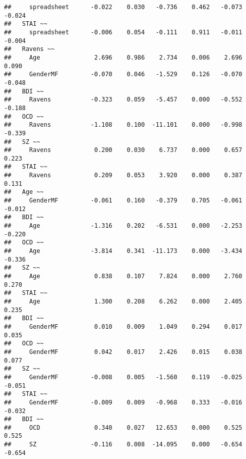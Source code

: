 \documentclass[]{article}
\begin{document}
\begin{verbatim}
##     spreadsheet      -0.022    0.030   -0.736    0.462   -0.073   -0.024
##   STAI ~~                                                               
##     spreadsheet      -0.006    0.054   -0.111    0.911   -0.011   -0.004
##   Ravens ~~                                                             
##     Age               2.696    0.986    2.734    0.006    2.696    0.090
##     GenderMF         -0.070    0.046   -1.529    0.126   -0.070   -0.048
##   BDI ~~                                                                
##     Ravens           -0.323    0.059   -5.457    0.000   -0.552   -0.188
##   OCD ~~                                                                
##     Ravens           -1.108    0.100  -11.101    0.000   -0.998   -0.339
##   SZ ~~                                                                 
##     Ravens            0.200    0.030    6.737    0.000    0.657    0.223
##   STAI ~~                                                               
##     Ravens            0.209    0.053    3.920    0.000    0.387    0.131
##   Age ~~                                                                
##     GenderMF         -0.061    0.160   -0.379    0.705   -0.061   -0.012
##   BDI ~~                                                                
##     Age              -1.316    0.202   -6.531    0.000   -2.253   -0.220
##   OCD ~~                                                                
##     Age              -3.814    0.341  -11.173    0.000   -3.434   -0.336
##   SZ ~~                                                                 
##     Age               0.838    0.107    7.824    0.000    2.760    0.270
##   STAI ~~                                                               
##     Age               1.300    0.208    6.262    0.000    2.405    0.235
##   BDI ~~                                                                
##     GenderMF          0.010    0.009    1.049    0.294    0.017    0.035
##   OCD ~~                                                                
##     GenderMF          0.042    0.017    2.426    0.015    0.038    0.077
##   SZ ~~                                                                 
##     GenderMF         -0.008    0.005   -1.560    0.119   -0.025   -0.051
##   STAI ~~                                                               
##     GenderMF         -0.009    0.009   -0.968    0.333   -0.016   -0.032
##   BDI ~~                                                                
##     OCD               0.340    0.027   12.653    0.000    0.525    0.525
##     SZ               -0.116    0.008  -14.095    0.000   -0.654   -0.654

\end{verbatim}
\end{document}
